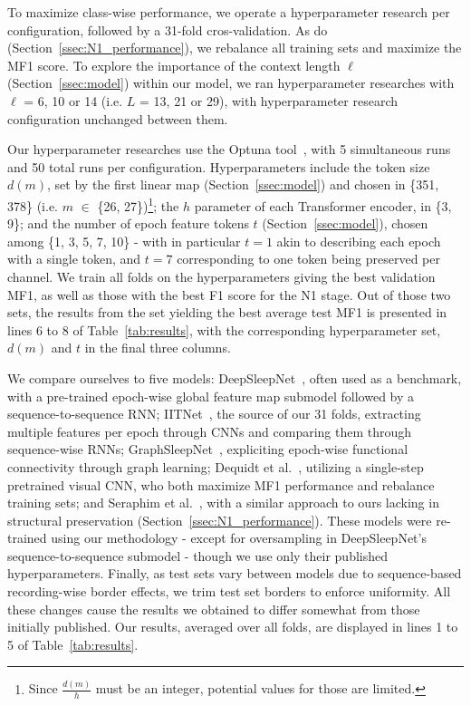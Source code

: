 \documentclass{article}
\makeatletter
\newcommand\footnoteref[1]{\protected@xdef\@thefnmark{\ref{#1}}\@footnotemark}
\makeatother
\begin{document}
To maximize class-wise performance, we operate a hyperparameter research per configuration, followed by a 31-fold cros-validation. As do~\cite{paul,CAIP_article} (Section~\ref{ssec:N1_performance}), we rebalance all training sets and maximize the MF1 score. 
To explore the importance of the context length $\ell$ (Section~\ref{ssec:model}) within our model, we ran hyperparameter researches with $\ell$ = 6, 10 or 14 (i.e. $L$ = 13, 21 or 29), with hyperparameter research configuration unchanged between them.

Our hyperparameter researches use the Optuna tool~\cite{akiba2019optuna}, with 5 simultaneous runs and 50 total runs per configuration. Hyperparameters include\footnoteref{fn:Git} the token size $d(m)$, set by the first linear map (Section~\ref{ssec:model}) and chosen in \{351, 378\} (i.e. $m$ $\in$ \{26, 27\})\footnote{\label{fn:d/h}Since $\frac{d(m)}{h}$ must be an integer, potential values for those are limited.};
the $h$ parameter of each Transformer encoder, in \{3, 9\}\footnoteref{fn:d/h};
and the number of epoch feature tokens $t$ (Section~\ref{ssec:model}), chosen among \{1, 3, 5, 7, 10\} - with in particular $t = 1$ akin to describing each epoch with a single token, and $t = 7$ corresponding to one token being preserved per channel.
We train all folds on the hyperparameters giving the best validation MF1, as well as those with the best F1 score for the N1 stage. Out of those two sets, the results from the set yielding the best average test MF1 is presented in lines 6 to 8 of Table~\ref{tab:results}, with the corresponding hyperparameter set, $d(m)$ and $t$ in the final three columns.

We compare ourselves to five models:
DeepSleepNet~\cite{Supratak2017}, often used as a benchmark, with a pre-trained epoch-wise global feature map submodel followed by a sequence-to-sequence RNN;
IITNet~\cite{SEO2020102037}, the source of our 31 folds, extracting multiple features per epoch through CNNs and comparing them through sequence-wise RNNs;
GraphSleepNet~\cite{jia2020graphsleepnet}, expliciting epoch-wise functional connectivity through graph learning;
Dequidt et al.~\cite{paul}, utilizing a single-step pretrained visual CNN, who both maximize MF1 performance and rebalance training sets;
and Seraphim et al.~\cite{CAIP_article}, with a similar approach to ours lacking in structural preservation (Section~\ref{ssec:N1_performance}).
These models were re-trained using our methodology - except for oversampling in DeepSleepNet's sequence-to-sequence submodel - though we use only their published hyperparameters.
Finally, as test sets vary between models due to sequence-based recording-wise border effects, we trim test set borders to enforce uniformity.
All these changes cause the results we obtained to differ somewhat from those initially published.
Our results, averaged over all folds, are displayed in lines 1 to 5 of Table~\ref{tab:results}.
\end{document}

